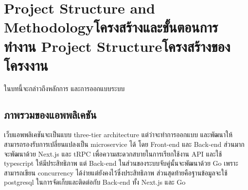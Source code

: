 \chapter{\ifproject%
\ifenglish Project Structure and Methodology\else โครงสร้างและขั้นตอนการทำงาน\fi
\else%
\ifenglish Project Structure\else โครงสร้างของโครงงาน\fi
\fi
}

ในบทนี้จะกล่าวถึงหลักการ และการออกแบบระบบ

\makeatletter


\makeatother

\section{ภาพรวมของแอพพลิเคชัน}

เว็บแอพพลิเคชันจะเป็นแบบ three-tier architecture แต่ว่าจะทำการออกแบบ และพัฒนาให้สามารถรองรับการเปลี่ยนแปลงเป็น 
microservice ได้ โดย Front-end และ Back-end ส่วนมากจะพัฒนาด้วย Next.js และ tRPC เพื่อความสะดวกสบายในการเรียกใช้งาน API
และใช้ typescript ให้มีประสิทธิภาพ แต่ Back-end ในส่วนของระบบจับคู่นั้นจะพัฒนาด้วย Go เพราะสามารถเขียน concurrency ได้ง่ายแต่ยังคงไว้ซึ่งประสิทธิภาพ
ส่วนสุดท้ายคือฐานข้อมูลจะใช้ postgresql ในการจัดเก็บและติดต่อกับ Back-end ทั้ง Next.js และ Go


